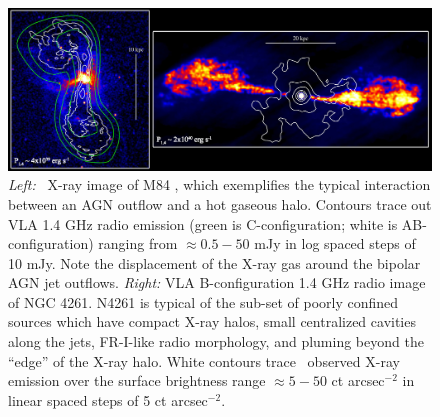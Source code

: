 \begin{figure}[htp]
  \begin{center}
    \begin{minipage}[htp]{\linewidth}
      \includegraphics*[width=\textwidth, trim=0mm 0mm 0mm 0mm, clip]{composite2.eps}
      \caption{{\it{Left:}} \chandra\ X-ray image of M84 \citep[NGC
          4374;][]{2001ApJ...547L.107F, 2008ApJ...686..911F}, which
        exemplifies the typical interaction between an AGN outflow and
        a hot gaseous halo. Contours trace out VLA 1.4 GHz radio
        emission (green is C-configuration; white is AB-configuration)
        ranging from $\approx 0.5-50$ mJy in log spaced steps of 10
        mJy. Note the displacement of the X-ray gas around the bipolar
        AGN jet outflows. {\it{Right:}} VLA B-configuration 1.4 GHz
        radio image of NGC 4261. N4261 is typical of the sub-set of
        poorly confined sources which have compact X-ray halos, small
        centralized cavities along the jets, FR-I-like radio
        morphology, and pluming beyond the ``edge'' of the X-ray
        halo. White contours trace \chandra\ observed X-ray emission
        over the surface brightness range $\approx 5-50$ ct
        arcsec$^{-2}$ in linear spaced steps of 5 ct arcsec$^{-2}$.}
      \label{fig:pics}
    \end{minipage}
  \end{center}
\end{figure}
